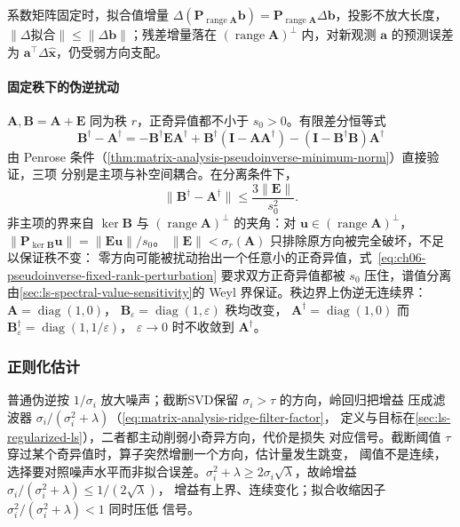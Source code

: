 系数矩阵固定时，拟合值增量
$\Delta(\bm P_{\operatorname{range}\bm A}\bm b)
=\bm P_{\operatorname{range}\bm A}\Delta\bm b$，投影不放大长度，
$\lVert\Delta\text{拟合}\rVert\leq\lVert\Delta\bm b\rVert$；残差增量落在
$(\operatorname{range}\bm A)^\perp$ 内，对新观测 $\bm a$ 的预测误差为
$\bm a^\top\Delta\hat{\bm x}$，仍受弱方向支配。

\paragraph{固定秩下的伪逆扰动}

$\bm A,\bm B=\bm A+\bm E$ 同为秩 $r$，正奇异值都不小于 $s_0>0$。有限差分恒等式
\[
 \bm B^\dagger-\bm A^\dagger
 =-\bm B^\dagger\bm E\bm A^\dagger
 +\bm B^\dagger(\bm I-\bm A\bm A^\dagger)
 -(\bm I-\bm B^\dagger\bm B)\bm A^\dagger
\]
由 Penrose 条件（\ref{thm:matrix-analysis-pseudoinverse-minimum-norm}）直接验证，三项
分别是主项与补空间耦合。在分离条件下，
\begin{equation}
 \lVert\bm B^\dagger-\bm A^\dagger\rVert
 \leq\frac{3\lVert\bm E\rVert}{s_0^2}.
 \label{eq:ch06-pseudoinverse-fixed-rank-perturbation}
\end{equation}
非主项的界来自 $\ker\bm B$ 与 $(\operatorname{range}\bm A)^\perp$ 的夹角：对
$\bm u\in(\operatorname{range}\bm A)^\perp$，
$\lVert\bm P_{\ker\bm B}\bm u\rVert=\lVert\bm E\bm u\rVert/s_0$。
$\lVert\bm E\rVert<\sigma_r(\bm A)$ 只排除原方向被完全破坏，不足以保证秩不变：
零方向可能被扰动抬出一个任意小的正奇异值，式~\eqref{eq:ch06-pseudoinverse-fixed-rank-perturbation}
要求双方正奇异值都被 $s_0$ 压住，谱值分离由\ref{sec:ls-spectral-value-sensitivity}的
Weyl 界保证。秩边界上伪逆无连续界：$\bm A=\operatorname{diag}(1,0)$，
$\bm B_\varepsilon=\operatorname{diag}(1,\varepsilon)$ 秩均改变，
$\bm A^\dagger=\operatorname{diag}(1,0)$ 而
$\bm B_\varepsilon^\dagger=\operatorname{diag}(1,1/\varepsilon)$，
$\varepsilon\to0$ 时不收敛到 $\bm A^\dagger$。

\subsubsection{正则化估计}
\label{sec:ls-regularized-estimate-sensitivity}

普通伪逆按 $1/\sigma_i$ 放大噪声；截断SVD保留 $\sigma_i>\tau$ 的方向，岭回归把增益
压成滤波器 $\sigma_i/(\sigma_i^2+\lambda)$（\ref{eq:matrix-analysis-ridge-filter-factor}，
定义与目标在\ref{sec:ls-regularized-ls}），二者都主动削弱小奇异方向，代价是损失
对应信号。截断阈值 $\tau$ 穿过某个奇异值时，算子突然增删一个方向，估计量发生跳变，
阈值不是连续，选择要对照噪声水平而非拟合误差。$\sigma_i^2+\lambda
\geq2\sigma_i\sqrt\lambda$，故岭增益 $\sigma_i/(\sigma_i^2+\lambda)\leq1/(2\sqrt\lambda)$，
增益有上界、连续变化；拟合收缩因子 $\sigma_i^2/(\sigma_i^2+\lambda)<1$ 同时压低
信号。

